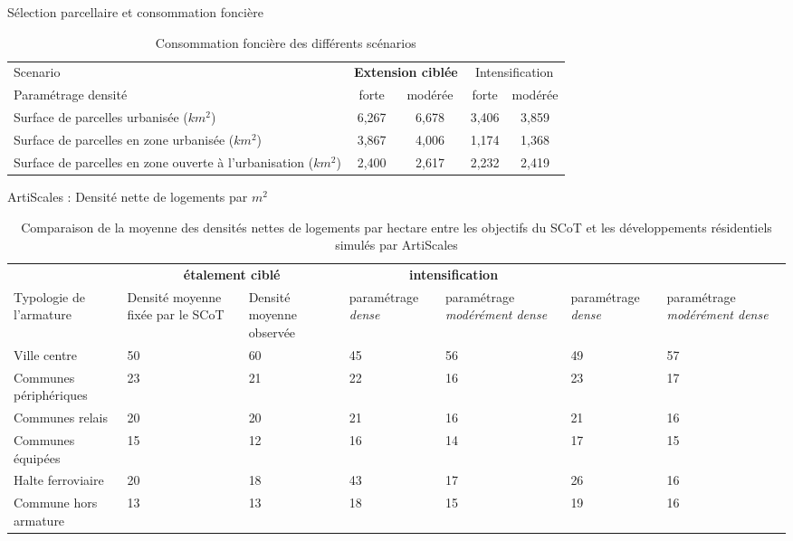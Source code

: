 \documentclass[xcolor=table]{beamer}
\begin{document}
\begin{frame}{Sélection parcellaire et consommation foncière}
\begin{table}
	\caption{Consommation foncière des différents scénarios}
	\scriptsize
	\begin{tabular}{|lcccc|}
		\hline 
		Scenario & \multicolumn{2}{c}{\textbf{Extension ciblée}} & \multicolumn{2}{c}{Intensification} \\ 
		Paramétrage densité & forte &modérée& forte&modérée\\
		\hline 
		Surface de parcelles urbanisée ($km^{2}$)& 6,267 &6,678&3,406& 3,859 \\	
		\hline 
		Surface de parcelles en zone urbanisée ($km^{2}$)& 3,867 &4,006&1,174& 1,368\\	
		\hline 
		Surface de parcelles en zone ouverte à l'urbanisation ($km^{2}$)&2,400&2,617&2,232&2,419\\ 
		\hline 
	\end{tabular} 
\end{table}
\end{frame}

\begin{frame}{ArtiScales : Densité nette de logements par $m^{2}$}
\begin{table}[h]
	{\footnotesize \caption{Comparaison de la moyenne des densités nettes de logements par hectare entre les objectifs du SCoT et les développements résidentiels simulés par ArtiScales}}	
	\tiny 
	\begin{center}
		\begin{tabular}{m{2.4cm}m{1.2cm}m{0.9cm}m{1cm}m{1cm}m{1cm}m{1cm}}
			\rowcolor[gray]{0.8}
			\multicolumn{3}{c}{Densité moyenne simulée dans le scénario~:}&\multicolumn{2}{c}{\textbf{étalement ciblé}} &\multicolumn{2}{c}{\textbf{intensification}}\\
			
			\rowcolor[gray]{0.9}
			Typologie de l'armature &
			Densité moyenne fixée par le SCoT &
			Densité moyenne observée&
			\cellcolor[gray]{0.8}paramétrage \textit{dense} & \cellcolor[gray]{0.8}paramétrage \textit{modérément dense}& \cellcolor[gray]{0.8}paramétrage \textit{dense} & \cellcolor[gray]{0.8}paramétrage \textit{modérément dense} \\ \hline
			
			Ville centre&50&60&45&56&49&57\\ \hline
			\rowcolor[gray]{0.9}Communes périphériques&23&21&22&16&23&17\\ \hline
			Communes relais &20&20&21&16&21&16\\ \hline
			\rowcolor[gray]{0.9}Communes équipées&15&12&16&14&17&15\\ \hline
			Halte ferroviaire&20&18&43&17&26&16 \\ \hline
			\rowcolor[gray]{0.9}Commune hors armature&13&13&18&15&19&16
			\\ \hline
		\end{tabular}
	\end{center}
\end{table}
\end{frame}
\end{document}
